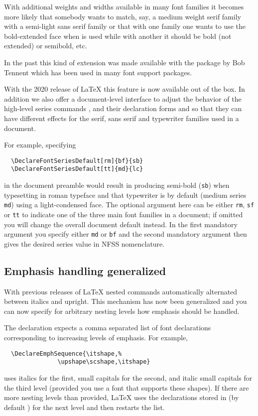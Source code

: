 \documentclass{ltnews}
\begin{document}
With additional weights and widths available in many font families it
becomes more likely that somebody wants to match, say, a medium weight
serif family with a semi-light sans serif family or that with one
family one wants to use the bold-extended face when  is used
while with another it should be bold (not extended) or semibold, etc.

In the past this kind of extension was made available with the
 package by Bob Tennent which has been used in many font
support packages.

With the 2020 release of \LaTeX{} this feature is now available out
of the box.  In addition we also offer a document-level interface to adjust the
behavior of the high-level series commands ,  and their
declaration forms  and  so that they can
have different effects for the serif, sans serif and typewriter
families used in a document.

For example, specifying
\begin{verbatim}
  \DeclareFontSeriesDefault[rm]{bf}{sb}
  \DeclareFontSeriesDefault[tt]{md}{lc}
\end{verbatim}
in the document preamble would result in  producing
semi-bold (\texttt{sb}) when typesetting in roman typeface and
that typewriter is by default (medium series \texttt{md}) using
a light-condensed face. The optional argument here can be either
\texttt{rm}, \texttt{sf} or \texttt{tt} to indicate one of the three
main font families in a document; if omitted you will change the
overall document default instead.  In the first mandatory argument you
specify either \texttt{md} or \texttt{bf} and the second mandatory
argument then gives the desired series value in NFSS nomenclature.


\subsection{Emphasis handling generalized}

With previous releases of \LaTeX{} nested  commands
automatically alternated between italics and upright.  This mechanism
has now been generalized and you can now specify for arbitrary nesting
levels how emphasis should be handled.

The declaration  expects a comma separated
list of font declarations corresponding to increasing levels of
emphasis. For example,
\begin{verbatim}
  \DeclareEmphSequence{\itshape,%
               \upshape\scshape,\itshape}
\end{verbatim}
uses italics for the first, small capitals for the second, and italic
small capitals for the third level (provided you use a font that
supports these shapes).  If there are more nesting levels than
provided, \LaTeX{} uses the declarations stored in  (by
default ) for the next level and then
restarts the list.
\end{document}
